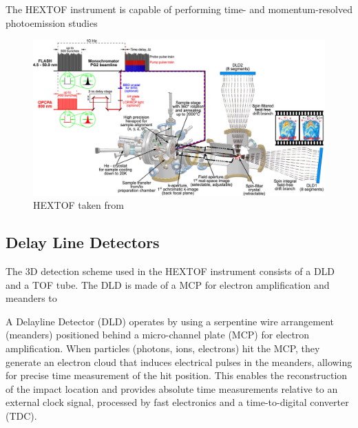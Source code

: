 



The \gls{HEXTOF} instrument is capable of performing time- and momentum-resolved photoemission studies 
\begin{figure}
    \centering
    \includegraphics[width=1\linewidth]{images/2024-08-27-10-50-01.png}
    \caption{HEXTOF taken from \cite{kutnyakhovTimeMomentumresolvedPhotoemission2020}}
\end{figure}

\subsection{Delay Line Detectors}
The 3D detection scheme used in the \gls{HEXTOF} instrument consists of a \gls{DLD} and a \gls{TOF} tube. The \gls{DLD} is made of a \gls{MCP} for electron amplification and meanders to 

A Delayline Detector (DLD) operates by using a serpentine wire arrangement (meanders) positioned behind a micro-channel plate (MCP) for electron amplification. When particles (photons, ions, electrons) hit the MCP, they generate an electron cloud that induces electrical pulses in the meanders, allowing for precise time measurement of the hit position. This enables the reconstruction of the impact location and provides absolute time measurements relative to an external clock signal, processed by fast electronics and a time-to-digital converter (TDC).

